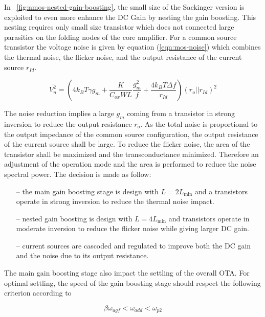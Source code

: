 In \figurename~\ref{fig:nmos-nested-gain-boosting}, the small size of the Sackinger version is exploited to even more enhance the DC Gain by nesting the gain boosting. This nesting requires only small size transistor which does not connected large parasitics on the folding nodes of the core amplifier. For a common source transistor the voltage noise is given by equation (\ref{eqn:mos-noise}) which combines the thermal noise, the flicker noise, and the output resistance of the current source \(r_{Id} \).

\begin{equation}
    \label{eqn:mos-noise}
\overline{V_n^2} = \left(4k_BT\gamma g_m + \frac{K}{C_{ox}WL} \frac{g_m^2}{f} + \frac{4k_BT\Delta f}{r_{Id}}\right) {(r_o || r_{Id})}^2
\end{equation}

The noise reduction implies a large \(g_m \) coming from a transistor in strong inversion to reduce the output resistance \(r_o\). As the total noise is proportional to the output impedance of the common source configuration, the output resistance of the current source shall be large. To reduce the flicker noise, the area of the transistor shall be maximized and the transconductance minimized. Therefore an adjustment of the operation mode and the area is performed to reduce the noise spectral power. The decision is made as follow:

\begin{itemize}
    \itemsep-0.5em
    \item[--] the main gain boosting stage is design with \(L=2L_{\min}\) and a transistors operate in strong inversion to reduce the thermal noise impact.
    \item[--] nested gain boosting is design with \(L=4L_{\min}\) and transistors operate in moderate inversion to reduce the flicker noise while giving larger DC gain.
    \item[--] current sources are cascoded and regulated to improve both the DC gain and the noise due to its output resistance.
\end{itemize}

The main gain boosting stage also impact the settling of the overall OTA\@. For optimal settling, the speed of the gain boosting stage should respect the following criterion according to~\cite{Bult1991}

\begin{equation}
\beta \omega_{ugf} < \omega_{add} < \omega_{p2}
\end{equation}

